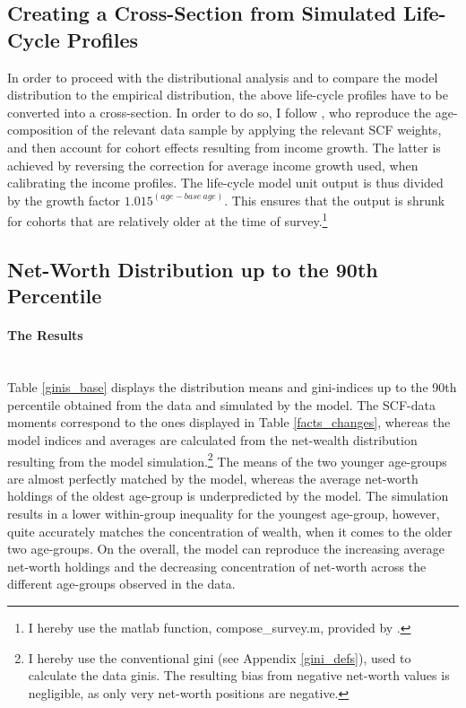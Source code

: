 \documentclass[a4paper,12pt,legno]{article}
\newcommand{\myparagraph}[1]{\paragraph{#1}\mbox{}\\}
\begin{document}
\subsection{Creating a Cross-Section from Simulated Life-Cycle Profiles}
In order to proceed with the distributional analysis and to compare the model distribution to the empirical distribution, the above life-cycle profiles have to be converted into a cross-section. In order to do so, I follow \cite{hintermaier2011}, who reproduce the age-composition of the relevant data sample by applying the relevant SCF weights, and then account for cohort effects resulting from income growth. The latter is achieved by reversing the correction for average income growth used, when calibrating the income profiles. The life-cycle model unit output is thus divided by the growth factor $1.015^{(age-base\ age)}$. This ensures that the output is shrunk for cohorts that are relatively older at the time of survey.\footnote{I hereby use the matlab function, compose\_survey.m, provided by \cite{hintermaier2016}.}

\subsection{Net-Worth Distribution up to the 90th Percentile}

\myparagraph{The Results}
Table \ref{ginis_base} displays the distribution means and gini-indices up to the 90th percentile obtained from the data and simulated by the model. The SCF-data moments correspond to the ones displayed in Table \ref{facts_changes}, whereas the model indices and averages are calculated from the net-wealth distribution resulting from the model simulation.\footnote{I hereby use the conventional gini (see Appendix \ref{gini_defs}), used to calculate the data ginis. The resulting bias from negative net-worth values \citep{chen1982} is negligible, as only very net-worth positions are negative.} The means of the two younger age-groups are almost perfectly matched by the model, whereas the average net-worth holdings of the oldest age-group is underpredicted by the model. The simulation results in a lower within-group inequality for the youngest age-group, however, quite accurately matches the concentration of wealth, when it comes to the older two age-groups. On the overall, the model can reproduce the increasing average net-worth holdings and the decreasing concentration of net-worth across the different age-groups observed in the data. 
\end{document}
